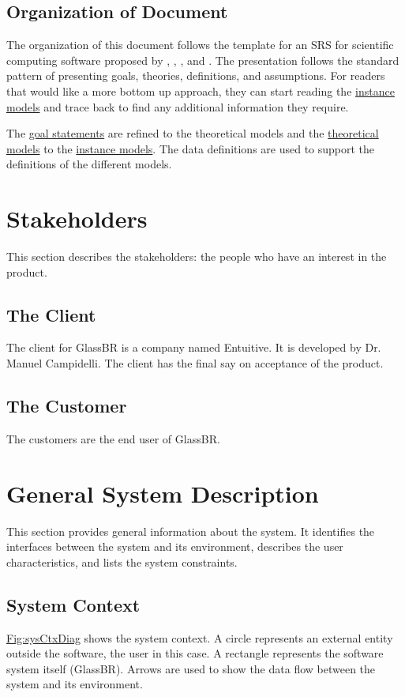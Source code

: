 \documentclass[12pt]{article}
\begin{document}
\subsection{Organization of Document}
\label{Sec:DocOrg}
The organization of this document follows the template for an SRS for scientific computing software proposed by \cite{koothoor2013}, \cite{smithLai2005}, \cite{smithEtAl2007}, and \cite{smithKoothoor2016}. The presentation follows the standard pattern of presenting goals, theories, definitions, and assumptions. For readers that would like a more bottom up approach, they can start reading the \hyperref[Sec:IMs]{instance models} and trace back to find any additional information they require.

The \hyperref[Sec:GoalStmt]{goal statements} are refined to the theoretical models and the \hyperref[Sec:TMs]{theoretical models} to the \hyperref[Sec:IMs]{instance models}. The data definitions are used to support the definitions of the different models.

\section{Stakeholders}
\label{Sec:Stakeholder}
This section describes the stakeholders: the people who have an interest in the product.

\subsection{The Client}
\label{Sec:Client}
The client for GlassBR is a company named Entuitive. It is developed by Dr. Manuel Campidelli. The client has the final say on acceptance of the product.

\subsection{The Customer}
\label{Sec:Customer}
The customers are the end user of GlassBR.

\section{General System Description}
\label{Sec:GenSysDesc}
This section provides general information about the system. It identifies the interfaces between the system and its environment, describes the user characteristics, and lists the system constraints.

\subsection{System Context}
\label{Sec:SysContext}
\hyperref[Figure:sysCtxDiag]{Fig:sysCtxDiag} shows the system context. A circle represents an external entity outside the software, the user in this case. A rectangle represents the software system itself (GlassBR). Arrows are used to show the data flow between the system and its environment.
\end{document}
